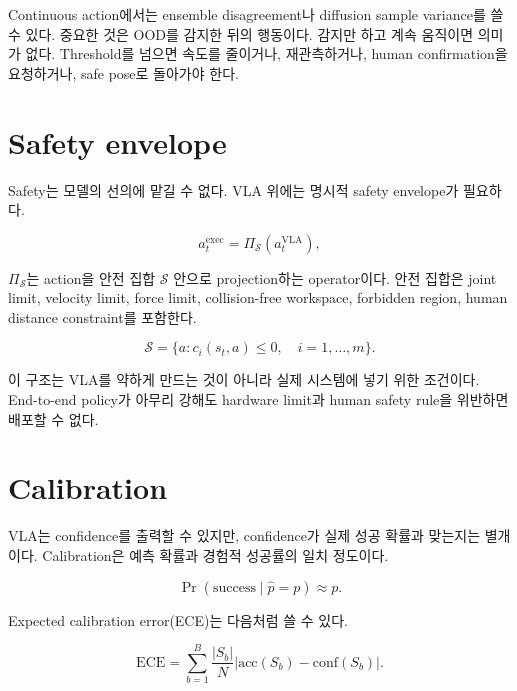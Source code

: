 Continuous action에서는 ensemble disagreement나 diffusion sample variance를 쓸 수 있다. 중요한 것은 OOD를 감지한 뒤의 행동이다. 감지만 하고 계속 움직이면 의미가 없다. Threshold를 넘으면 속도를 줄이거나, 재관측하거나, human confirmation을 요청하거나, safe pose로 돌아가야 한다.

\section{Safety envelope}

Safety는 모델의 선의에 맡길 수 없다. VLA 위에는 명시적 safety envelope가 필요하다.

\begin{equation}
  a_t^{\mathrm{exec}}
  =
  \Pi_{\mathcal{S}}
  \left(
    a_t^{\mathrm{VLA}}
  \right),
\end{equation}

$\Pi_{\mathcal{S}}$는 action을 안전 집합 $\mathcal{S}$ 안으로 projection하는 operator이다. 안전 집합은 joint limit, velocity limit, force limit, collision-free workspace, forbidden region, human distance constraint를 포함한다.

\begin{equation}
  \mathcal{S}
  =
  \{a:
  c_i(s_t,a) \le 0,
  \quad i=1,\ldots,m
  \}.
\end{equation}

이 구조는 VLA를 약하게 만드는 것이 아니라 실제 시스템에 넣기 위한 조건이다. End-to-end policy가 아무리 강해도 hardware limit과 human safety rule을 위반하면 배포할 수 없다.

\section{Calibration}

VLA는 confidence를 출력할 수 있지만, confidence가 실제 성공 확률과 맞는지는 별개이다. Calibration은 예측 확률과 경험적 성공률의 일치 정도이다.

\begin{equation}
  \Pr(\mathrm{success} \mid \hat{p}=p)
  \approx
  p.
\end{equation}

Expected calibration error(ECE)는 다음처럼 쓸 수 있다.

\begin{equation}
  \mathrm{ECE}
  =
  \sum_{b=1}^{B}
  \frac{|S_b|}{N}
  \left|
    \mathrm{acc}(S_b)
    -
    \mathrm{conf}(S_b)
  \right|.
\end{equation}

